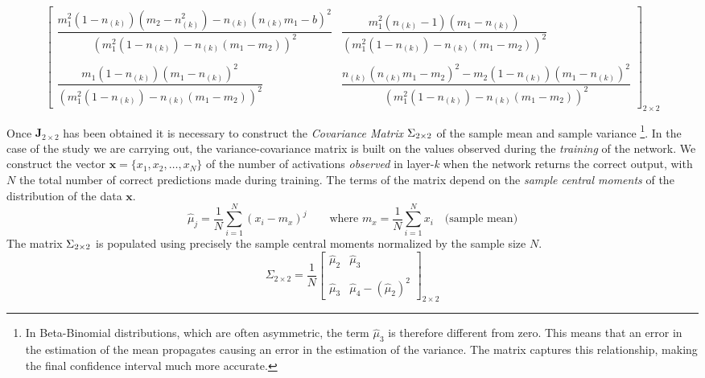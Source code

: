 \documentclass[10pt]{article} %
\begin{document}
\begin{equation}
    \begin{bmatrix}
        \dfrac{m_{1}^{2}(1-n_{(k)})(m_{2}-n_{(k)}^{2}) - n_{(k)}(n_{(k)}m_{1}-b)^{2}}{(m_{1}^{2}(1-n_{(k)}) - n_{(k)}(m_{1}-m_{2}))^{2}} & 
        \dfrac{m_{1}^{2}(n_{(k)}-1)(m_{1}-n_{(k)})}{(m_{1}^{2}(1-n_{(k)}) - n_{(k)}(m_{1}-m_{2}))^{2}} \\ \\
        \dfrac{m_{1}(1-n_{(k)})(m_{1}-n_{(k)})^{2}}{(m_{1}^{2}(1-n_{(k)}) - n_{(k)}(m_{1}-m_{2}))^{2}} & 
        \dfrac{n_{(k)}(n_{(k)}m_{1}-m_{2})^{2} - m_{2}(1-n_{(k)})(m_{1}-n_{(k)})^{2}}{(m_{1}^{2}(1-n_{(k)}) - n_{(k)}(m_{1}-m_{2}))^{2}}
    \end{bmatrix}_{2\times2}
\end{equation}

Once $\mathbf{J}_{2\times2}$ has been obtained it is necessary to construct the \textit{Covariance Matrix} $\large\Sigma_{2\times2}$ of the sample mean and sample variance \footnote{In Beta-Binomial distributions, which are often asymmetric, the term $\hat{\mu}_{3}$ is therefore different from zero. This means that an error in the estimation of the mean propagates causing an error in the estimation of the variance. The matrix captures this relationship, making the final confidence interval much more accurate.}. In the case of the study we are carrying out, the variance-covariance matrix is built on the values observed during the \textit{training} of the network. We construct the vector $\mathbf{x} = \{x_{1}, x_{2}, \dots, x_{N}\}$ of the number of activations \textit{observed} in layer-\textit{k} when the network returns the correct output, with $N$ the total number of correct predictions made during training. The terms of the matrix depend on the \textit{sample central moments} of the distribution of the data $\mathbf{x}$.
\begin{equation}
    \hat{\mu}_{j} = \dfrac{1}{N}\sum_{i=1}^{N}(x_{i}-m_{x})^{j}\qquad\mbox{where } m_{x} = \dfrac{1}{N}\sum_{i=1}^{N}x_{i} \quad\mbox{(sample mean)}
\end{equation}
The matrix $\large\Sigma_{2\times2}$ is populated using precisely the sample central moments normalized by the sample size $N$.
\begin{equation}
    \Sigma_{2\times2} = \dfrac{1}{N} 
    \begin{bmatrix}
        \hat{\mu}_{2} & \hat{\mu}_{3} \\ \\
        \hat{\mu}_{3} & \hat{\mu}_{4} - (\hat{\mu}_{2})^{2}
    \end{bmatrix}_{2\times2}
\end{equation}
\end{document}
